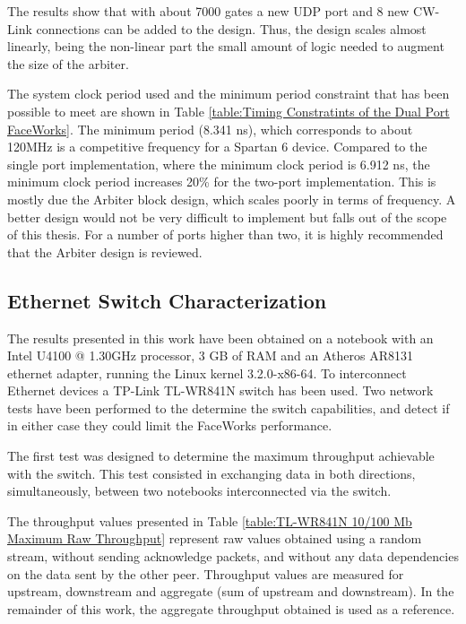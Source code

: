 \documentclass[conference]{IEEEtran}
\begin{document}
The results show that with about 7000 gates  a new UDP port and 8 new CW-Link connections can be added to the design. Thus, the design scales almost linearly, being the non-linear part the small amount of logic needed to augment the size of the arbiter.



The system clock period used and the minimum period constraint that has been possible to meet are shown in Table  \ref{table:Timing Constratints of the Dual Port FaceWorks}. The minimum period (8.341 ns), which corresponds to about 120MHz is a competitive frequency for a Spartan 6 device. Compared to the single port implementation, where the minimum clock period is 6.912 ns, the minimum clock period increases 20\% for the two-port implementation. This is mostly due the Arbiter block design, which scales poorly in terms of frequency. A better design would not be very difficult to implement but falls out of the scope of this thesis. For a number of ports higher than two, it is highly recommended that the Arbiter design is reviewed.

\subsection{Ethernet Switch Characterization}

The results presented in this work have been obtained on a notebook with an Intel U4100 @ 1.30GHz processor, 3 GB of RAM and an Atheros AR8131 ethernet adapter, running the Linux kernel 3.2.0-x86-64. To interconnect Ethernet devices a TP-Link TL-WR841N switch has been used. Two network tests have been performed to the determine the switch capabilities, and detect if in either case they could limit the FaceWorks performance.

The first test was designed to determine the maximum throughput achievable with the switch. This test consisted in exchanging data in both directions, simultaneously, between two notebooks interconnected via the switch.

The throughput values presented in Table \ref{table:TL-WR841N 10/100 Mb Maximum Raw Throughput} represent raw values obtained using a random stream, without sending acknowledge packets, and without any data dependencies on the data sent by the other peer. Throughput values are measured for upstream, downstream and aggregate (sum of upstream and downstream). In the remainder of this work, the aggregate throughput obtained is used as a reference.
\end{document}

